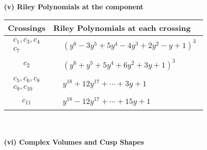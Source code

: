 \documentclass[1p]{elsarticle_modified}
\theoremstyle{definition}
\begin{document}
\newpage\renewcommand{\arraystretch}{1}
\flushleft \textbf{(v) Riley Polynomials at the component}\newline \\
\begin{tabular}{m{50pt}|m{274pt}}
Crossings & \hspace{64pt}Riley Polynomials at each crossing \\
\hline $$\begin{aligned}c_{1},c_{3},c_{4}\\c_{7}\end{aligned}$$&$\begin{aligned}
&(y^6-3 y^5+5 y^4-4 y^3+2 y^2- y+1)^3
\end{aligned}$\\
\hline $$\begin{aligned}c_{2}\end{aligned}$$&$\begin{aligned}
&(y^6+y^5+5 y^4+6 y^2+3 y+1)^3
\end{aligned}$\\
\hline $$\begin{aligned}c_{5},c_{6},c_{8}\\c_{9},c_{10}\end{aligned}$$&$\begin{aligned}
&y^{18}+12 y^{17}+\cdots+3 y+1
\end{aligned}$\\
\hline $$\begin{aligned}c_{11}\end{aligned}$$&$\begin{aligned}
&y^{18}-12 y^{17}+\cdots+15 y+1
\end{aligned}$\\
\hline
\end{tabular}\\~\\
\newpage\flushleft \textbf{(vi) Complex Volumes and Cusp Shapes}
\end{document}
